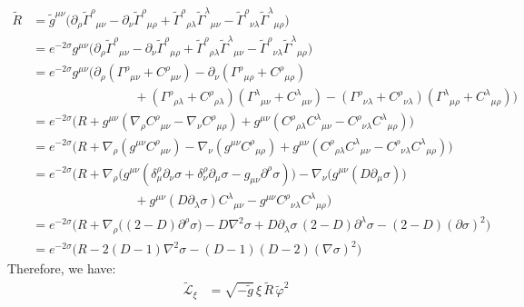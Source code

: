 \begin{solution}[27.3]
\[\]
$$
\begin{aligned}
	\tilde R
	&= \tilde g^{\mu\nu}\Big(\partial_\rho \tilde\Gamma^{\rho}{}_{\mu\nu}-\partial_\nu \tilde\Gamma^{\rho}{}_{\mu\rho}
	+\tilde\Gamma^{\rho}{}_{\rho\lambda}\tilde\Gamma^{\lambda}{}_{\mu\nu}
	-\tilde\Gamma^{\rho}{}_{\nu\lambda}\tilde\Gamma^{\lambda}{}_{\mu\rho}\Big)\\
	&= e^{-2\sigma}g^{\mu\nu}\Big(\partial_\rho \tilde\Gamma^{\rho}{}_{\mu\nu}-\partial_\nu \tilde\Gamma^{\rho}{}_{\mu\rho}
	+\tilde\Gamma^{\rho}{}_{\rho\lambda}\tilde\Gamma^{\lambda}{}_{\mu\nu}
	-\tilde\Gamma^{\rho}{}_{\nu\lambda}\tilde\Gamma^{\lambda}{}_{\mu\rho}\Big)\\
	&
	= e^{-2\sigma}g^{\mu\nu}\Big(\partial_\rho(\Gamma^{\rho}{}_{\mu\nu}+C^{\rho}{}_{\mu\nu})
	-\partial_\nu(\Gamma^{\rho}{}_{\mu\rho}+C^{\rho}{}_{\mu\rho})\\
	&\qquad\qquad\qquad\qquad
	+(\Gamma^{\rho}{}_{\rho\lambda}+C^{\rho}{}_{\rho\lambda})(\Gamma^{\lambda}{}_{\mu\nu}+C^{\lambda}{}_{\mu\nu})
	-(\Gamma^{\rho}{}_{\nu\lambda}+C^{\rho}{}_{\nu\lambda})(\Gamma^{\lambda}{}_{\mu\rho}+C^{\lambda}{}_{\mu\rho})\Big)\\
	&= e^{-2\sigma}\Big(R
	+g^{\mu\nu}(\nabla_\rho C^{\rho}{}_{\mu\nu}-\nabla_\nu C^{\rho}{}_{\mu\rho})
	+g^{\mu\nu}(C^{\rho}{}_{\rho\lambda}C^{\lambda}{}_{\mu\nu}-C^{\rho}{}_{\nu\lambda}C^{\lambda}{}_{\mu\rho})\Big)\\
	&= e^{-2\sigma}\Big(R
	+\nabla_\rho(g^{\mu\nu}C^{\rho}{}_{\mu\nu})-\nabla_\nu(g^{\mu\nu}C^{\rho}{}_{\mu\rho})
	+g^{\mu\nu}(C^{\rho}{}_{\rho\lambda}C^{\lambda}{}_{\mu\nu}-C^{\rho}{}_{\nu\lambda}C^{\lambda}{}_{\mu\rho})\Big)\\
	&= e^{-2\sigma}\Big(R
	+\nabla_\rho\big(g^{\mu\nu}(\delta^\rho_\mu\partial_\nu\sigma+\delta^\rho_\nu\partial_\mu\sigma-g_{\mu\nu}\partial^\rho\sigma)\big)
	-\nabla_\nu\big(g^{\mu\nu}(D\partial_\mu\sigma)\big)\\
	&\qquad\qquad\qquad\qquad
	+g^{\mu\nu}(D\partial_\lambda\sigma)C^{\lambda}{}_{\mu\nu}
	-g^{\mu\nu}C^{\rho}{}_{\nu\lambda}C^{\lambda}{}_{\mu\rho}\Big)\\
	&= e^{-2\sigma}\Big(R
	+\nabla_\rho\big((2-D)\partial^\rho\sigma\big)-D\nabla^2\sigma
	+D\partial_\lambda\sigma\,(2-D)\partial^\lambda\sigma-(2-D)(\partial\sigma)^2\Big)\\
	&= e^{-2\sigma}\Big(R-2(D-1)\nabla^2\sigma-(D-1)(D-2)(\nabla\sigma)^2\Big)
\end{aligned}
$$
Therefore, we have:
$$
\begin{aligned}
	\tilde{\mathcal L}_\xi
	&=\sqrt{-\tilde g}\,\xi\,\tilde R\,\tilde\varphi^{2}\\

\end{aligned}$$
\end{solution}
